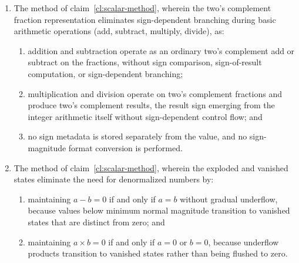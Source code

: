 \documentclass[12pt,letter]{article}
\begin{document}
\begin{enumerate}
    \item The method of claim~\ref{cl:scalar-method}, wherein the two's complement fraction representation eliminates sign-dependent branching during basic arithmetic operations (add, subtract, multiply, divide), as:
          \begin{enumerate}
              \item addition and subtraction operate as an ordinary two's complement add or subtract on the fractions, without sign comparison, sign-of-result computation, or sign-dependent branching;
              \item multiplication and division operate on two's complement fractions and produce two's complement results, the result sign emerging from the integer arithmetic itself without sign-dependent control flow; and
              \item no sign metadata is stored separately from the value, and no sign-magnitude format conversion is performed.
          \end{enumerate}

    \item The method of claim~\ref{cl:scalar-method}, wherein the exploded and vanished states eliminate the need for denormalized numbers by:
          \begin{enumerate}
              \item maintaining $a - b = 0$ if and only if $a = b$ without gradual underflow, because values below minimum normal magnitude transition to vanished states that are distinct from zero; and
              \item maintaining $a \times b = 0$ if and only if $a = 0$ or $b = 0$, because underflow products transition to vanished states rather than being flushed to zero.
          \end{enumerate}


\end{enumerate}
\end{document}
